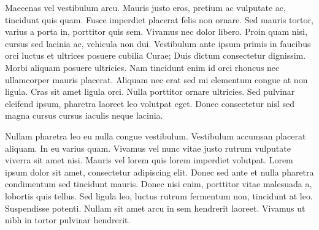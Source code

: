 Maecenas vel vestibulum arcu. Mauris justo eros, pretium ac vulputate ac, tincidunt quis quam. Fusce imperdiet placerat felis non ornare. Sed mauris tortor, varius a porta in, porttitor quis sem. Vivamus nec dolor libero. Proin quam nisi, cursus sed lacinia ac, vehicula non dui. Vestibulum ante ipsum primis in faucibus orci luctus et ultrices posuere cubilia Curae; Duis dictum consectetur dignissim. Morbi aliquam posuere ultricies. Nam tincidunt enim id orci rhoncus nec ullamcorper mauris placerat. Aliquam nec erat sed mi elementum congue at non ligula. Cras sit amet ligula orci. Nulla porttitor ornare ultricies. Sed pulvinar eleifend ipsum, pharetra laoreet leo volutpat eget. Donec consectetur nisl sed magna cursus cursus iaculis neque lacinia. 

Nullam pharetra leo eu nulla congue vestibulum. Vestibulum accumsan placerat aliquam. In eu varius quam. Vivamus vel nunc vitae justo rutrum vulputate viverra sit amet nisi. Mauris vel lorem quis lorem imperdiet volutpat. Lorem ipsum dolor sit amet, consectetur adipiscing elit. Donec sed ante et nulla pharetra condimentum sed tincidunt mauris. Donec nisi enim, porttitor vitae malesuada a, lobortis quis tellus. Sed ligula leo, luctus rutrum fermentum non, tincidunt at leo. Suspendisse potenti. Nullam sit amet arcu in sem hendrerit laoreet. Vivamus ut nibh in tortor pulvinar hendrerit. 